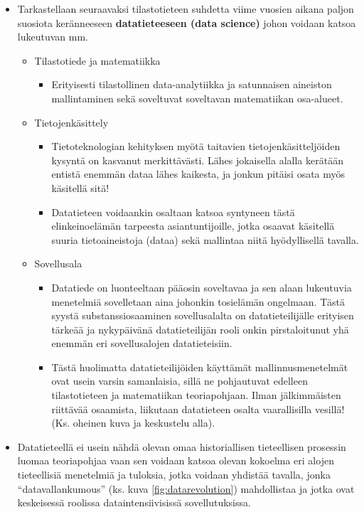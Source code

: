 \documentclass[
]{book}
\providecommand{\tightlist}{%
  \setlength{\itemsep}{0pt}\setlength{\parskip}{0pt}}
\begin{document}
\begin{itemize}
\tightlist
\item
  Tarkastellaan seuraavaksi tilastotieteen suhdetta viime vuosien aikana paljon suosiota keränneeseen \textbf{datatieteeseen (data science)} johon voidaan katsoa lukeutuvan mm.

  \begin{itemize}
  \tightlist
  \item
    Tilastotiede ja matematiikka

    \begin{itemize}
    \tightlist
    \item
      Erityisesti tilastollinen data-analytiikka ja satunnaisen aineiston mallintaminen sekä soveltuvat soveltavan matematiikan osa-alueet.
    \end{itemize}
  \item
    Tietojenkäsittely

    \begin{itemize}
    \tightlist
    \item
      Tietoteknologian kehityksen myötä taitavien tietojenkäsitteljöiden kysyntä on kasvanut merkittävästi. Lähes jokaisella alalla kerätään entistä enemmän dataa lähes kaikesta, ja jonkun pitäisi osata myös käsitellä sitä!
    \item
      Datatieteen voidaankin osaltaan katsoa syntyneen tästä elinkeinoelämän tarpeesta asiantuntijoille, jotka osaavat käsitellä suuria tietoaineistoja (dataa) sekä mallintaa niitä hyödyllisellä tavalla.
    \end{itemize}
  \item
    Sovellusala

    \begin{itemize}
    \tightlist
    \item
      Datatiede on luonteeltaan pääosin soveltavaa ja sen alaan lukeutuvia menetelmiä sovelletaan aina johonkin tosielämän ongelmaan. Tästä syystä substanssiosaaminen sovellusalalta on datatieteilijälle erityisen tärkeää ja nykypäivänä datatieteilijän rooli onkin pirstaloitunut yhä enemmän eri sovellusalojen datatieteisiin.
    \item
      Tästä huolimatta datatieteilijöiden käyttämät mallinnusmenetelmät ovat usein varsin samanlaisia, sillä ne pohjautuvat edelleen tilastotieteen ja matematiikan teoriapohjaan. Ilman jälkimmäisten riittävää osaamista, liikutaan datatieteen osalta vaarallisilla vesillä! (Ks. oheinen kuva ja keskustelu alla).\\
    \end{itemize}
  \end{itemize}
\item
  Datatieteellä ei usein nähdä olevan omaa historiallisen tieteellisen prosessin luomaa teoriapohjaa vaan sen voidaan katsoa olevan kokoelma eri alojen tieteellisiä menetelmiä ja tuloksia, jotka voidaan yhdistää tavalla, jonka ``datavallankumous'' (ks. kuva \ref{fig:datarevolution}) mahdollistaa ja jotka ovat keskeisessä roolissa dataintensiivisissä sovellutuksissa.
\end{itemize}
\end{document}
